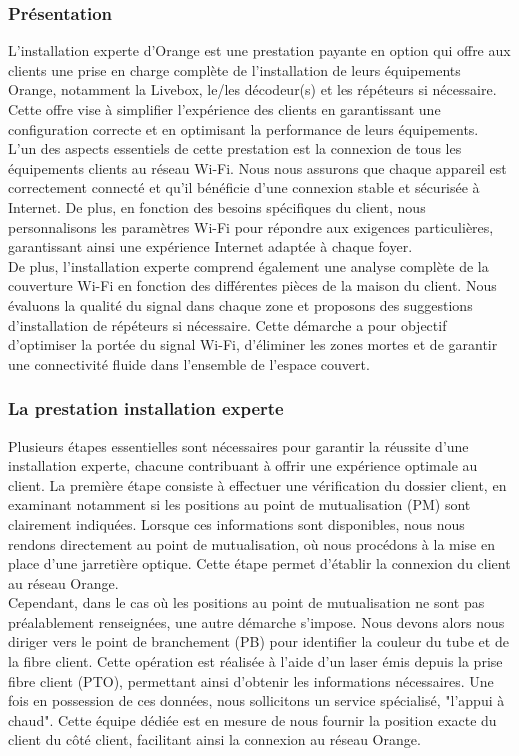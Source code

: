 \documentclass[12pt, a4paper]{article}
\begin{document}
\subsubsection{Présentation}
L'installation experte d'Orange est une
prestation payante en option qui offre aux clients
une prise en charge complète de l'installation de leurs
équipements Orange, notamment la Livebox, le/les décodeur(s)
et les répéteurs si nécessaire. Cette offre vise à simplifier
l'expérience des clients en garantissant une configuration
correcte et en optimisant la performance de leurs équipements.\\

L'un des aspects essentiels de cette prestation est la
connexion de tous les équipements clients au réseau Wi-Fi.
Nous nous assurons que chaque appareil est
correctement connecté et qu'il bénéficie d'une connexion
stable et sécurisée à Internet. De plus, en fonction des besoins
spécifiques du client, nous personnalisons les paramètres Wi-Fi
pour répondre aux exigences particulières, garantissant ainsi
une expérience Internet adaptée à chaque foyer.\\

De plus, l'installation experte comprend également une analyse
complète de la couverture Wi-Fi en fonction des différentes
pièces de la maison du client. Nous évaluons
la qualité du signal dans chaque zone et proposons des
suggestions d'installation de répéteurs si nécessaire. Cette
démarche a pour objectif d'optimiser la portée du signal Wi-Fi,
d'éliminer les zones mortes et de garantir une connectivité fluide
dans l'ensemble de l'espace couvert.
\subsubsection{La prestation installation experte}
Plusieurs étapes essentielles sont nécessaires pour garantir
la réussite d'une installation experte, chacune contribuant à offrir
une expérience optimale au client. La première étape consiste à
effectuer une vérification du dossier client, en examinant notamment
si les positions au point de mutualisation (PM) sont clairement indiquées.
Lorsque ces informations sont disponibles, nous nous rendons
directement au point de mutualisation, où nous procédons à la
mise en place d'une jarretière optique. Cette étape permet d'établir
la connexion du client au réseau Orange.\\

Cependant, dans le cas où les positions au point de mutualisation ne
sont pas préalablement renseignées, une autre démarche s'impose.
Nous devons alors nous diriger vers le point de branchement (PB)
pour identifier la couleur du tube et de la fibre client.
Cette opération est réalisée à l'aide d'un laser émis depuis
la prise fibre client (PTO), permettant ainsi d'obtenir les
informations nécessaires. Une fois en possession de ces données,
nous sollicitons un service spécialisé, "l'appui à chaud". Cette
équipe dédiée est en mesure de nous fournir la position exacte du
client du côté client, facilitant ainsi la connexion au réseau Orange.\\
\end{document}
